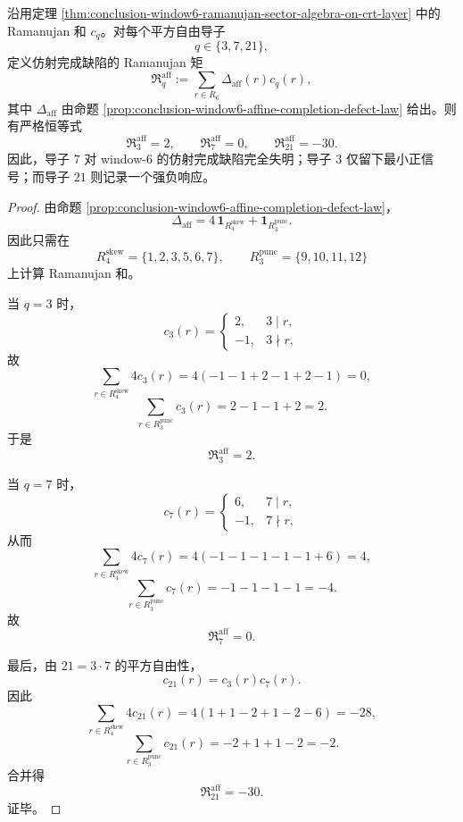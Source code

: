 \begin{theorem}\label{thm:conclusion-window6-affine-defect-ramanujan-moments}
沿用定理 \ref{thm:conclusion-window6-ramanujan-sector-algebra-on-crt-layer} 中的 Ramanujan 和 \(c_q\)。对每个平方自由导子
\[
q\in\{3,7,21\},
\]
定义仿射完成缺陷的 Ramanujan 矩
\[
\mathfrak R_q^{\mathrm{aff}}
:=
\sum_{r\in R_6}\Delta_{\mathrm{aff}}(r)c_q(r),
\]
其中 \(\Delta_{\mathrm{aff}}\) 由命题 \ref{prop:conclusion-window6-affine-completion-defect-law} 给出。则有严格恒等式
\[
\mathfrak R_3^{\mathrm{aff}}=2,
\qquad
\mathfrak R_7^{\mathrm{aff}}=0,
\qquad
\mathfrak R_{21}^{\mathrm{aff}}=-30.
\]
因此，导子 \(7\) 对 window-\(6\) 的仿射完成缺陷完全失明；导子 \(3\) 仅留下最小正信号；而导子 \(21\) 则记录一个强负响应。
\end{theorem}
\begin{proof}
由命题 \ref{prop:conclusion-window6-affine-completion-defect-law}，
\[
\Delta_{\mathrm{aff}}
=
4\,\mathbf 1_{R_{4}^{\mathrm{skew}}}
+\mathbf 1_{R_{3}^{\mathrm{punc}}}.
\]
因此只需在
\[
R_{4}^{\mathrm{skew}}=\{1,2,3,5,6,7\},
\qquad
R_{3}^{\mathrm{punc}}=\{9,10,11,12\}
\]
上计算 Ramanujan 和。

当 \(q=3\) 时，
\[
c_3(r)=
\begin{cases}
2,& 3\mid r,\\
-1,& 3\nmid r,
\end{cases}
\]
故
\[
\sum_{r\in R_{4}^{\mathrm{skew}}}4c_3(r)
=
4(-1-1+2-1+2-1)=0,
\]
\[
\sum_{r\in R_{3}^{\mathrm{punc}}}c_3(r)
=
2-1-1+2=2.
\]
于是
\[
\mathfrak R_3^{\mathrm{aff}}=2.
\]

当 \(q=7\) 时，
\[
c_7(r)=
\begin{cases}
6,& 7\mid r,\\
-1,& 7\nmid r,
\end{cases}
\]
从而
\[
\sum_{r\in R_{4}^{\mathrm{skew}}}4c_7(r)
=
4(-1-1-1-1-1+6)=4,
\]
\[
\sum_{r\in R_{3}^{\mathrm{punc}}}c_7(r)
=
-1-1-1-1=-4.
\]
故
\[
\mathfrak R_7^{\mathrm{aff}}=0.
\]

最后，由 \(21=3\cdot 7\) 的平方自由性，
\[
c_{21}(r)=c_3(r)c_7(r).
\]
因此
\[
\sum_{r\in R_{4}^{\mathrm{skew}}}4c_{21}(r)
=
4(1+1-2+1-2-6)=-28,
\]
\[
\sum_{r\in R_{3}^{\mathrm{punc}}}c_{21}(r)
=
-2+1+1-2=-2.
\]
合并得
\[
\mathfrak R_{21}^{\mathrm{aff}}=-30.
\]
证毕。
\end{proof}

